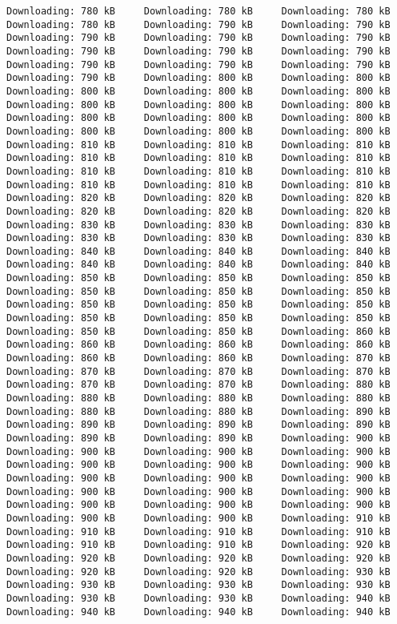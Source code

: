 \documentclass[
  12pt,
  portuguese,
]{report}
\begin{document}
\begin{verbatim}
Downloading: 780 kB     Downloading: 780 kB     Downloading: 780 kB     Downloading: 780 kB     Downloading: 790 kB     Downloading: 790 kB     Downloading: 790 kB     Downloading: 790 kB     Downloading: 790 kB     Downloading: 790 kB     Downloading: 790 kB     Downloading: 790 kB     Downloading: 790 kB     Downloading: 790 kB     Downloading: 790 kB     Downloading: 790 kB     Downloading: 800 kB     Downloading: 800 kB     Downloading: 800 kB     Downloading: 800 kB     Downloading: 800 kB     Downloading: 800 kB     Downloading: 800 kB     Downloading: 800 kB     Downloading: 800 kB     Downloading: 800 kB     Downloading: 800 kB     Downloading: 800 kB     Downloading: 800 kB     Downloading: 800 kB     Downloading: 810 kB     Downloading: 810 kB     Downloading: 810 kB     Downloading: 810 kB     Downloading: 810 kB     Downloading: 810 kB     Downloading: 810 kB     Downloading: 810 kB     Downloading: 810 kB     Downloading: 810 kB     Downloading: 810 kB     Downloading: 810 kB     Downloading: 820 kB     Downloading: 820 kB     Downloading: 820 kB     Downloading: 820 kB     Downloading: 820 kB     Downloading: 820 kB     Downloading: 830 kB     Downloading: 830 kB     Downloading: 830 kB     Downloading: 830 kB     Downloading: 830 kB     Downloading: 830 kB     Downloading: 840 kB     Downloading: 840 kB     Downloading: 840 kB     Downloading: 840 kB     Downloading: 840 kB     Downloading: 840 kB     Downloading: 850 kB     Downloading: 850 kB     Downloading: 850 kB     Downloading: 850 kB     Downloading: 850 kB     Downloading: 850 kB     Downloading: 850 kB     Downloading: 850 kB     Downloading: 850 kB     Downloading: 850 kB     Downloading: 850 kB     Downloading: 850 kB     Downloading: 850 kB     Downloading: 850 kB     Downloading: 860 kB     Downloading: 860 kB     Downloading: 860 kB     Downloading: 860 kB     Downloading: 860 kB     Downloading: 860 kB     Downloading: 870 kB     Downloading: 870 kB     Downloading: 870 kB     Downloading: 870 kB     Downloading: 870 kB     Downloading: 870 kB     Downloading: 880 kB     Downloading: 880 kB     Downloading: 880 kB     Downloading: 880 kB     Downloading: 880 kB     Downloading: 880 kB     Downloading: 890 kB     Downloading: 890 kB     Downloading: 890 kB     Downloading: 890 kB     Downloading: 890 kB     Downloading: 890 kB     Downloading: 900 kB     Downloading: 900 kB     Downloading: 900 kB     Downloading: 900 kB     Downloading: 900 kB     Downloading: 900 kB     Downloading: 900 kB     Downloading: 900 kB     Downloading: 900 kB     Downloading: 900 kB     Downloading: 900 kB     Downloading: 900 kB     Downloading: 900 kB     Downloading: 900 kB     Downloading: 900 kB     Downloading: 900 kB     Downloading: 900 kB     Downloading: 900 kB     Downloading: 910 kB     Downloading: 910 kB     Downloading: 910 kB     Downloading: 910 kB     Downloading: 910 kB     Downloading: 910 kB     Downloading: 920 kB     Downloading: 920 kB     Downloading: 920 kB     Downloading: 920 kB     Downloading: 920 kB     Downloading: 920 kB     Downloading: 930 kB     Downloading: 930 kB     Downloading: 930 kB     Downloading: 930 kB     Downloading: 930 kB     Downloading: 930 kB     Downloading: 940 kB     Downloading: 940 kB     Downloading: 940 kB     Downloading: 940 kB     
\end{verbatim}
\end{document}
